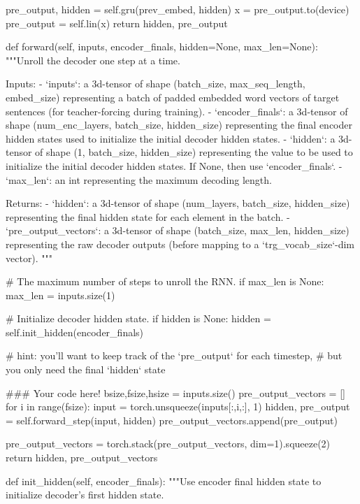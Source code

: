 \begin{python}
    pre_output, hidden = self.gru(prev_embed, hidden)
    x = pre_output.to(device)
    pre_output = self.lin(x)
    return hidden, pre_output
    
  def forward(self, inputs, encoder_finals, hidden=None, max_len=None):
    """Unroll the decoder one step at a time.

    Inputs:
      - `inputs`: a 3d-tensor of shape (batch_size, max_seq_length, embed_size)
          representing a batch of padded embedded word vectors of target
          sentences (for teacher-forcing during training).
      - `encoder_finals`: a 3d-tensor of shape
          (num_enc_layers, batch_size, hidden_size) representing the final
          encoder hidden states used to initialize the initial decoder hidden
          states.
      - `hidden`: a 3d-tensor of shape (1, batch_size, hidden_size) representing
          the value to be used to initialize the initial decoder hidden states.
          If None, then use `encoder_finals`.
      - `max_len`: an int representing the maximum decoding length.

    Returns:
      - `hidden`: a 3d-tensor of shape
          (num_layers, batch_size, hidden_size) representing the final hidden
          state for each element in the batch.
      - `pre_output_vectors`: a 3d-tensor of shape
          (batch_size, max_len, hidden_size) representing the raw decoder
          outputs (before mapping to a `trg_vocab_size`-dim vector).
    """

    # The maximum number of steps to unroll the RNN.
    if max_len is None:
      max_len = inputs.size(1)

    # Initialize decoder hidden state.
    if hidden is None:
      hidden = self.init_hidden(encoder_finals)

    # hint: you'll want to keep track of the `pre_output` for each timestep,
    #       but you only need the final `hidden` state

    ### Your code here!
    bsize,fsize,hsize = inputs.size()
    pre_output_vectors = []
    for i in range(fsize):
      input = torch.unsqueeze(inputs[:,i,:], 1)
      hidden, pre_output = self.forward_step(input, hidden)
      pre_output_vectors.append(pre_output)

    pre_output_vectors = torch.stack(pre_output_vectors, dim=1).squeeze(2)
    return hidden, pre_output_vectors

  def init_hidden(self, encoder_finals):
    """Use encoder final hidden state to initialize decoder's first hidden
       state.


\end{python}
